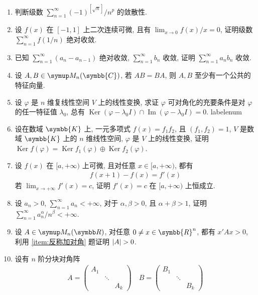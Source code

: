 \documentclass{ctexart}
\makeatletter
\def\asteriskitem{*}
\def\sitem{%
  \expandafter\let\expandafter\originallabel\csname labelenum\romannumeral\@enumdepth\endcsname
  \expandafter\def\csname labelenum\romannumeral\@enumdepth\expandafter\endcsname\expandafter{%
    \expandafter\bfseries\expandafter\color{red}\expandafter{\expandafter\asteriskitem\expandafter\originallabel}}%
  \item
  \expandafter\let\csname labelenum\romannumeral\@enumdepth\endcsname\originallabel
}
\newcommand{\limit}[2]{\lim_{#1 \to #2}}
\newcommand{\R}{\ensuremath{\symbb{R}}}
\newcommand{\K}{\ensuremath{\symbb{K}}}
\newcommand{\C}{\ensuremath{\symbb{C}}}
\DeclareMathOperator{\Image}{Im}
\DeclareMathOperator{\Ker}{Ker}
\makeatother
\begin{document}
\begin{enumerate}[series=exer]
    \item 判断级数 $ \sum_{n=1}^{\infty} (-1)^{[\sqrt{n}]}/n^{p} $ 的敛散性.
    \item 设 $ f(x) $ 在 $ [-1, 1] $ 上二次连续可微, 且有 $ \limit{x}{0} f(x)/x = 0 $, 证明级数 $ \sum_{n=1}^{\infty}f(1/n) $ 绝对收敛.
    \item 已知 $ \sum_{n=1}^{\infty}(a_{n} - a_{n-1}) $ 绝对收敛, $ \sum_{n=1}^{\infty}b_{n} $ 收敛, 证明 $ \sum_{n=1}^{\infty}a_{n}b_{n} $ 收敛.
    \item 设 $ A, B \in \MM[\C] $, 若 $ AB = BA $, 则 $ A, B $ 至少有一个公共的特征向量. 
    \item 设 $ \varphi $ 是 $ n $ 维复线性空间 $ V $ 上的线性变换, 求证 $ \varphi $ 可对角化的充要条件是对 $ \varphi $ 的任一特征值 $ \lambda_{0} $, 总有 $ \Ker(\varphi - \lambda_{0}I) \cap \Image(\varphi - \lambda_{0}I) = 0 $. 
    \sitem 设在数域 $ \K $ 上, 一元多项式 $ f(x) = f_{1}f_{2} $, 且 $ (f_{1}, f_{2}) = 1 $, $ V $ 是数域 $ \K $ 上的 $ n $ 维线性空间, $ \varphi $ 是 $ V $ 上的线性变换, 证明 $ \Ker f(\varphi) = \Ker f_{1}(\varphi) \oplus \Ker f_{2}(\varphi) $. 
    \item 设 $ f(x) $ 在 $ [a, +\infty) $ 上可微, 且对任意 $ x \in [a, +\infty) $, 都有
    \begin{align*}
        f(x+1) - f(x) = f'(x)
    \end{align*}
    若 $ \limit{x}{+\infty}f'(x) = c $, 证明 $ f'(x) = c $ 在 $ [a, +\infty) $ 上恒成立.
    \item 设 $ a_{n} > 0 $, $ \sum_{n=1}^{\infty}a_{n} < +\infty $, 对于 $ \alpha, \beta > 0 $, 且 $ \alpha + \beta > 1 $, 证明 $ \sum_{n=1}^{\infty} a_{n}^{\alpha}/n^{\beta} < +\infty $. 
    \item 设 $ A \in \MM $, 对任意 $ 0\ne x \in \R^{n} $, 都有 $ x'Ax > 0 $, 利用 \ref{item:反称加对角} 题证明 $ \abs{A} > 0 $.
    \item 设有 $ n $ 阶分块对角阵 
    \begin{align*}
        A = \begin{pmatrix}
            A_{1} & & \\
            & \ddots & \\
            & & A_{k}
        \end{pmatrix}\quad 
        B = \begin{pmatrix}
            B_{1} & & \\
            & \ddots & \\
            & & B_{k}
        \end{pmatrix}
    \end{align*}

\end{enumerate}
\end{document}
